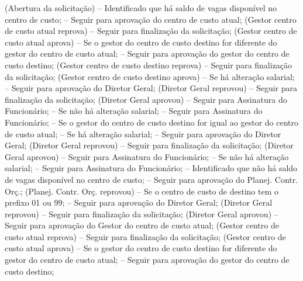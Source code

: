 
(Abertura da solicitação)
   -- Identificado que há saldo de vagas disponível no centro de custo;
      -- Seguir para aprovação do centro de custo atual;
         (Gestor centro de custo atual reprova)
            -- Seguir para finalização da solicitação;
         (Gestor centro de custo atual aprova)
            -- Se o gestor do centro de custo destino for diferente do gestor do centro de custo atual;
               -- Seguir para aprovação do gestor do centro de custo destino;
                  (Gestor centro de custo destino reprova)
                     -- Seguir para finalização da solicitação;
                  (Gestor centro de custo destino aprova)
                     -- Se há alteração salarial;
                        -- Seguir para aprovação do Diretor Geral;
                           (Diretor Geral reprovou)
                              -- Seguir para finalização da solicitação;
                           (Diretor Geral aprovou)
                              -- Seguir para Assinatura do Funcionário;
                     -- Se não há alteração salarial;
                        -- Seguir para Assinatura do Funcionário;
            -- Se o gestor do centro de custo destino for igual ao gestor do centro de custo atual;
               -- Se há alteração salarial;
                  -- Seguir para aprovação do Diretor Geral;
                     (Diretor Geral reprovou)
                        -- Seguir para finalização da solicitação;
                     (Diretor Geral aprovou)
                        -- Seguir para Assinatura do Funcionário;
               -- Se não há alteração salarial;
                  -- Seguir para Assinatura do Funcionário;
   -- Identificado que não há saldo de vagas disponível no centro de custo;
      -- Seguir para aprovação do Planej. Contr. Orç.;
         (Planej. Contr. Orç. reprovou)
            -- Se o centro de custo de destino tem o prefixo 01 ou 99;
               -- Seguir para aprovação do Diretor Geral;
                  (Diretor Geral reprovou)
                     -- Seguir para finalização da solicitação;
                  (Diretor Geral aprovou)
                     -- Seguir para aprovação do Gestor do centro de custo atual;
                        (Gestor centro de custo atual reprova)
                           -- Seguir para finalização da solicitação;
                        (Gestor centro de custo atual aprova)
                           -- Se o gestor do centro de custo destino for diferente do gestor do centro de custo atual;
                              -- Seguir para aprovação do gestor do centro de custo destino;

